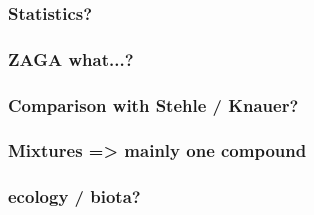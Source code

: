 \documentclass[10pt
	]{beamer}
\begin{document}
\appendix

\begin{frame}
\frametitle{Statistics?}

\end{frame}


\begin{frame}
\frametitle{ZAGA what...?}

\end{frame}


\begin{frame}
\frametitle{Comparison with Stehle / Knauer?}

\end{frame}

\begin{frame}
\frametitle{Mixtures => mainly one compound}

\end{frame}



\begin{frame}
\frametitle{ecology / biota?}

\end{frame}


\end{document}
